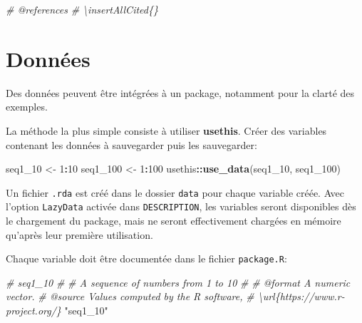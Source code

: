 \documentclass[
  12pt,
  french,
  a4paper,
  extrafontsizes,onecolumn,openright
  ]{memoir}
\newenvironment{Shaded}{\begin{snugshade}}{\end{snugshade}}
\newcommand{\CommentTok}[1]{\textcolor[rgb]{0.56,0.35,0.01}{\textit{#1}}}
\newcommand{\DecValTok}[1]{\textcolor[rgb]{0.00,0.00,0.81}{#1}}
\newcommand{\FunctionTok}[1]{\textcolor[rgb]{0.13,0.29,0.53}{\textbf{#1}}}
\newcommand{\NormalTok}[1]{#1}
\newcommand{\OtherTok}[1]{\textcolor[rgb]{0.56,0.35,0.01}{#1}}
\newcommand{\SpecialCharTok}[1]{\textcolor[rgb]{0.81,0.36,0.00}{\textbf{#1}}}
\newcommand{\StringTok}[1]{\textcolor[rgb]{0.31,0.60,0.02}{#1}}
\begin{document}
\scriptsize

\begin{Shaded}
\begin{Highlighting}[]
\CommentTok{\#\textquotesingle{} @references}
\CommentTok{\#\textquotesingle{} \textbackslash{}insertAllCited\{\}}
\end{Highlighting}
\end{Shaded}

\normalsize

\section{Données}\label{donnuxe9es}

Des données peuvent être intégrées à un package, notamment pour la clarté des exemples.

La méthode la plus simple consiste à utiliser \textbf{usethis}.
Créer des variables contenant les données à sauvegarder puis les sauvegarder:

\scriptsize

\begin{Shaded}
\begin{Highlighting}[]
\NormalTok{seq1\_10 }\OtherTok{\textless{}{-}} \DecValTok{1}\SpecialCharTok{:}\DecValTok{10}
\NormalTok{seq1\_100 }\OtherTok{\textless{}{-}} \DecValTok{1}\SpecialCharTok{:}\DecValTok{100}
\NormalTok{usethis}\SpecialCharTok{::}\FunctionTok{use\_data}\NormalTok{(seq1\_10, seq1\_100)}
\end{Highlighting}
\end{Shaded}

\normalsize

Un fichier \texttt{.rda} est créé dans le dossier \texttt{data} pour chaque variable créée.
Avec l'option \texttt{LazyData} activée dans \texttt{DESCRIPTION}, les variables seront disponibles dès le chargement du package, mais ne seront effectivement chargées en mémoire qu'après leur première utilisation.

Chaque variable doit être documentée dans le fichier \texttt{package.R}:

\scriptsize

\begin{Shaded}
\begin{Highlighting}[]
\CommentTok{\#\textquotesingle{} seq1\_10}
\CommentTok{\#\textquotesingle{}}
\CommentTok{\#\textquotesingle{} A sequence of numbers from 1 to 10}
\CommentTok{\#\textquotesingle{}}
\CommentTok{\#\textquotesingle{} @format A numeric vector.}
\CommentTok{\#\textquotesingle{} @source Values computed by the R software, }
\CommentTok{\#\textquotesingle{}   \textbackslash{}url\{https://www.r{-}project.org/\}}
\StringTok{"seq1\_10"}
\end{Highlighting}
\end{Shaded}
\end{document}
